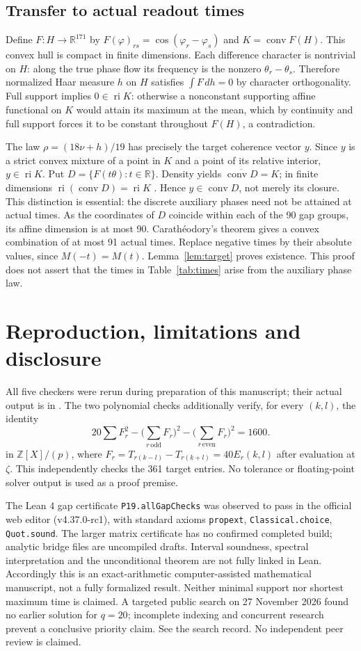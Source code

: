 \documentclass[11pt,a4paper]{article}
\newcommand{\R}{\mathbb R}\newcommand{\Q}{\mathbb Q}\newcommand{\Z}{\mathbb Z}\newcommand{\T}{\mathbb T}
\DeclareMathOperator{\conv}{conv}\DeclareMathOperator{\ri}{ri}
\begin{document}
\subsection{Transfer to actual readout times}
Define $F:H\to\R^{171}$ by $F(\varphi)_{rs}=\cos(\varphi_r-\varphi_s)$ and $K=\conv F(H)$. This convex hull is compact in finite dimensions. Each difference character is nontrivial on $H$: along the true phase flow its frequency is the nonzero $\theta_r-\theta_s$. Therefore normalized Haar measure $h$ on $H$ satisfies $\int F\,dh=0$ by character orthogonality. Full support implies $0\in\ri K$: otherwise a nonconstant supporting affine functional on $K$ would attain its maximum at the mean, which by continuity and full support forces it to be constant throughout $F(H)$, a contradiction.

The law $\rho=(18\nu+h)/19$ has precisely the target coherence vector $y$. Since $y$ is a strict convex mixture of a point in $K$ and a point of its relative interior, $y\in\ri K$. Put $D=\{F(t\theta):t\in\R\}$. Density yields $\overline{\conv D}=K$; in finite dimensions $\ri(\conv D)=\ri K$ \cite{rock}. Hence $y\in\conv D$, not merely its closure. This distinction is essential: the discrete auxiliary phases need not be attained at actual times. As the coordinates of $D$ coincide within each of the 90 gap groups, its affine dimension is at most 90. Carathéodory's theorem gives a convex combination of at most 91 actual times. Replace negative times by their absolute values, since $M(-t)=M(t)$. Lemma~\ref{lem:target} proves existence. This proof does not assert that the times in Table~\ref{tab:times} arise from the auxiliary phase law.
\section{Reproduction, limitations and disclosure}
All five checkers were rerun during preparation of this manuscript; their actual output is in . The two polynomial checks additionally verify, for every $(k,l)$, the identity \[20\sum F_r^2-\Big(\sum_{r\,\mathrm{odd}} F_r\Big)^2-\Big(\sum_{r\,\mathrm{even}} F_r\Big)^2=1600.\] in $\Z[X]/(p)$, where $F_r=T_{r(k-l)}-T_{r(k+l)}=40E_r(k,l)$ after evaluation at $\zeta$. This independently checks the 361 target entries. No tolerance or floating-point solver output is used as a proof premise.

The Lean 4 gap certificate \texttt{P19.allGapChecks} was observed to pass in the official web editor (v4.37.0-rc1), with standard axioms \texttt{propext}, \texttt{Classical.choice}, \texttt{Quot.sound}. The larger matrix certificate has no confirmed completed build; analytic bridge files are uncompiled drafts. Interval soundness, spectral interpretation and the unconditional theorem are not fully linked in Lean. Accordingly this is an exact-arithmetic computer-assisted mathematical manuscript, not a fully formalized result. Neither minimal support nor shortest maximum time is claimed. A targeted public search on 27 November 2026 found no earlier solution for $q=20$; incomplete indexing and concurrent research prevent a conclusive priority claim. See the search record. No independent peer review is claimed.
\end{document}
